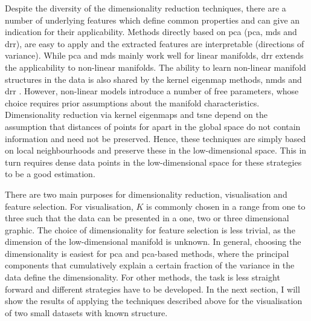 Despite the diversity of the dimensionality reduction techniques, there are a number of underlying features which define common properties and can give an indication for their applicability. Methods directly based on \gls{pca} (\gls{pca}, \gls{mds} and \gls{drr}), are easy to apply and the extracted features are interpretable (directions of variance). While \gls{pca} and \gls{mds} mainly work well for linear manifolds, \gls{drr} extends the applicability to non-linear manifolds. The ability to learn non-linear manifold structures in the data is also shared by the kernel eigenmap methods, \gls{nmds} and \gls{drr} \citep{Coifman2006}. However, non-linear models introduce a number of free parameters, whose choice requires prior assumptions about the manifold characteristics. Dimensionality reduction via kernel eigenmaps and \gls{tsne} depend on the assumption that distances of points for apart in the global space do not contain information and need not be preserved. Hence, these techniques are simply based on local neighbourhoods and preserve these in the low-dimensional space. This in turn requires dense data points in the low-dimensional space for these strategies to be a good estimation. 

There are two main purposes for dimensionality reduction, visualisation and feature selection.  For visualisation, \(K\) is commonly chosen in a range from one to three such that the data can be presented in a one, two or three dimensional graphic. The choice of dimensionality for feature selection is less trivial, as the dimension of the low-dimensional manifold is unknown. In general, choosing the dimensionality is easiest for \gls{pca} and \gls{pca}-based methods, where the principal components that cumulatively explain a certain fraction of the variance in the data define the dimensionality. For other methods, the task is less straight forward and different strategies have to be developed.  In the next section, I will show the results of applying the techniques described above for the visualisation of two small datasets with known structure.
